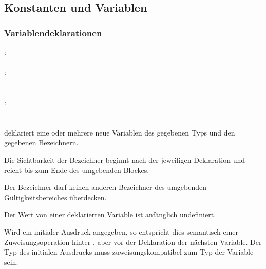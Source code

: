 \subsection{Konstanten und Variablen}\label{Konstanten und Variablen}
\subsubsection{Variablendeklarationen}\label{Variablendeklarationen}
:\label{dekl_var}\\
\hspace*{1cm} \Gspace{} \\
:\label{dekl_var_bzch_init_liste}\\
\hspace*{1cm} \\
\hspace*{1cm} \Gspace\Gt{,}\Gspace{} \\
:\label{dekl_var_bzch_init}\\
\hspace*{1cm} \\
\hspace*{1cm} \Gspace\Gt{=}\Gspace{} \\

 deklariert eine oder mehrere neue Variablen des gegebenen Typs und den gegebenen Bezeichnern.

Die Sichtbarkeit der Bezeichner beginnt nach der jeweiligen Deklaration
und reicht bis zum Ende des umgebenden Blockes.

Der Bezeichner darf keinen anderen Bezeichner des umgebenden Gültigkeitsbereiches überdecken.

Der Wert von einer deklarierten Variable ist anfänglich undefiniert.

Wird ein initialer Ausdruck angegeben, so entspricht dies semantisch einer Zuweisungsoperation
hinter , aber vor der Deklaration der nächsten Variable.
Der Typ des initialen Ausdrucks muss zuweisungskompatibel zum Typ der Variable sein.

